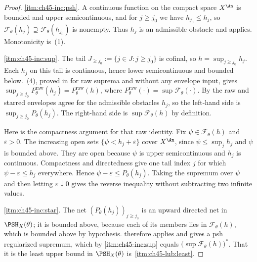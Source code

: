 \begin{proof}
\cref{itm:ch45-inc:psh}.  A continuous function on the compact space
$X^{\An}$ is bounded and upper semicontinuous, and for $j\ge j_0$ we
have $h_{j_0}\le h_j$, so $\mathcal F_\theta(h_j)\supseteq\mathcal F_\theta(h_{j_0})$
is nonempty.  Thus $h_j$ is an admissible obstacle and
 applies.  Monotonicity is
\,(1).

\cref{itm:ch45-inc:sup}.  The tail $J_{\ge j_0}:=\{j\in J:j\ge j_0\}$
is cofinal, so $h=\sup_{j\ge j_0}h_j$.  Each $h_j$ on this tail is
continuous, hence lower semicontinuous and bounded below.
\,(4), proved in
 for raw suprema and without any envelope
input, gives
$\sup_{j\ge j_0}P^{\mathrm{raw}}_\theta(h_j)=P^{\mathrm{raw}}_\theta(h)$, where
$P^{\mathrm{raw}}_\theta(\cdot)=\sup\mathcal F_\theta(\cdot)$.  By
 the raw and starred envelopes agree
for the admissible obstacles $h_j$, so the left-hand side is
$\sup_{j\ge j_0}P_\theta(h_j)$.  The right-hand side is $\sup\mathcal F_\theta(h)$ by
definition.

Here is the compactness argument for that raw identity.  Fix
$\psi\in\mathcal F_\theta(h)$ and $\varepsilon>0$.  The increasing open
sets $\{\psi<h_j+\varepsilon\}$ cover $X^{\An}$, since
$\psi\le\sup_jh_j$ and $\psi$ is bounded above.  They are open because
$\psi$ is upper semicontinuous and $h_j$ is continuous.  Compactness and
directedness give one tail index $j$ for which
$\psi-\varepsilon\le h_j$ everywhere.  Hence
$\psi-\varepsilon\le P_\theta(h_j)$.  Taking the supremum over $\psi$
and then letting $\varepsilon\downarrow0$ gives the reverse inequality
without subtracting two infinite values.

\cref{itm:ch45-inc:star}.  The net $(P_\theta(h_j))_{j\ge j_0}$ is an
upward directed net in $\PSH_X(\theta)$; it is bounded above, because each
of its members lies in $\mathcal F_\theta(h)$, which is bounded above by
hypothesis.   therefore applies and gives
a psh regularized supremum, which by \cref{itm:ch45-inc:sup} equals
$\bigl(\sup\mathcal F_\theta(h)\bigr)^*$.  That it is the least upper bound in
$\PSH_X(\theta)$ is \,\cref{itm:ch45-lub:least}.
\end{proof}

